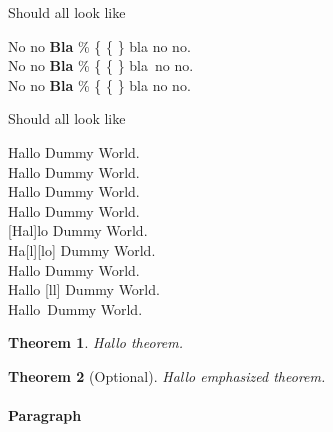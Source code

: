 \documentclass[12pt]{article}
\begin{document}
{\begin{lcHtmlBlock}
Should all look like

No no \textbf{Bla} \% \{ \{ \} bla no no.\\
%
\newcommand{\macrod}{\textbf{Bla} \% \{ \{ \} bla}
No no \macrod\ no no.\\
%
\newcommand{\|}{\textbf{Bla} \% \{ \{ \} bla}
%
No no \| no no.

Should all look like

Hallo Dummy World.\\
%
\newenvironment{c}{Hallo}{World}
\begin{c} Dummy \end{c}.\\
%
\newenvironment{d}[1]{#1}{World}
\begin{d}{Hallo} Dummy \end{d}.\\
%
\newenvironment{e}[1]{#1}{World}
\newcommand{\begin@e@om}{#1#2}
\begin{e}{Hallo} Dummy \end{e}.\\
\begin{e}[Hal]{lo} Dummy \end{e}.\\
%
\newcommand{\begin@e@moo}{#1#2#3}
\begin{e}{Ha}[l][lo] Dummy \end{e}.\\
%
\newenvironment{ee}{Hallo }{World}
\newcommand{\begin@ee@o}{Ha#1o}
\begin{ee} Dummy \end{ee}.\\
\begin{ee}[ll] Dummy \end{ee}.\\
%
Hallo~Dummy World.

\newtheorem{mytheorem}{Theorem}

\begin{mytheorem}
    Hallo theorem.
\end{mytheorem}

\begin{mytheorem}[Optional]
    Hallo {\em emphasized\/} theorem.
\end{mytheorem}

\paragraph{Paragraph}


\end{lcHtmlBlock}}
\end{document}
